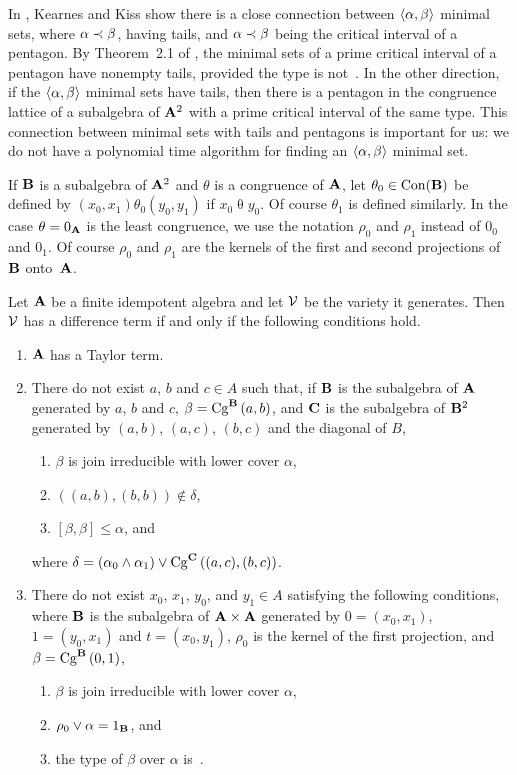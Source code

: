 In \cite{KearnesKiss1999}, Kearnes and Kiss show there is a close connection
between $\la \alpha,\beta\ra$ minimal sets, where $\alpha \cov \beta$, 
having tails, and  $\alpha \cov \beta$ being the critical interval of
a pentagon. By Theorem~2.1 of \cite{KearnesKiss1999}, the minimal sets
of a prime critical interval of a pentagon have nonempty tails, provided
the type is not~\utyp. In the other direction, if the 
$\la \alpha,\beta\ra$ minimal sets have tails, then there is a pentagon in
the congruence lattice of a subalgebra of $\alg A^2$ with a prime critical 
interval of the same type. This connection between minimal sets with tails and
pentagons is important for us: we do not have a polynomial time algorithm
for finding an $\la \alpha,\beta\ra$ minimal set.

If $\alg B$ is a subalgebra of $\alg A^2$ and $\theta$ is a congruence
of $\alg A$, let $\theta_0 \in \con (\alg B)$ be defined by
$(x_0,x_1) \mathrel{\theta_0} (y_0,y_1)$ if 
$x_0 \mathrel{\theta} y_0$. Of course $\theta_1$ is defined similarly.
In the case $\theta = 0_{\alg A}$ is the least congruence,
we use the notation $\rho_0$ and $\rho_1$ instead of 
$0_0$ and $0_1$. Of course $\rho_0$ and $\rho_1$ are the kernels
of the first and second projections of $\alg B$ onto~$\alg A$.



\begin{theorem}\label{thm:algorithm}
Let $\alg A$ be a finite idempotent algebra and let $\sV$ be the variety 
it generates. Then $\sV$ has a difference term if and only if the
following conditions hold.
\begin{enumerate}
\item $\alg A$ has a Taylor term.
\item There do not exist $a$, $b$ and $c\in A$
such that, if\/ $\alg B$ is the subalgebra of $\alg A$ generated
by $a$, $b$ and $c$,  $\beta = \Cga a b B$, and
$\alg C$ is the subalgebra of $\alg B^2$ generated by 
$(a,b)$, $(a,c)$, $(b,c)$ and the diagonal of $B$,
\begin{enumerate}
\item $\beta$ is join irreducible with lower cover $\alpha$,
\item $((a,b),(b,b)) \notin \delta$, 
\item $[\beta,\beta] \le \alpha$, and
\end{enumerate}
where $\delta = (\alpha_0 \meet \alpha_1) \join \Cga {(a,c)} {(b,c)} C$.
\item There do not exist $x_0$, $x_1$, $y_0$, and $y_1\in A$ satisfying
the following conditions, where 
$\alg B$ is the subalgebra of 
$\alg A \times \alg A$ generated by $0 = (x_0, x_1)$, $1 = (y_0,x_1)$ 
and $t = (x_0,y_1)$, $\rho_0$ is the kernel of the first projection,
and $\beta = \Cga01{B}$,
\begin{enumerate}
\item $\beta$ is join irreducible with lower cover $\alpha$,
\item 
$\rho_0 \join \alpha = 1_{\alg B}$, and
\item the type of $\beta$ over  $\alpha$ is~\atyp.
\end{enumerate}
\end{enumerate}
\end{theorem}

